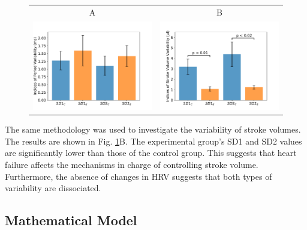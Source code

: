 \documentclass[%
preprint,
 amsmath,amssymb,
 aps,
]{revtex4-2}
\begin{document}
\begin{figure}[h!]
    \begin{tabular}{cc}
        A & B \\
        \includegraphics[width=3in]{Fig02_A.pdf} &
        \includegraphics[width=3in]{Fig02_B.pdf}
    \end{tabular}
    \caption{}
    \label{fig:fig02}
\end{figure}

The same methodology was used to investigate the variability of stroke volumes. The results are shown in Fig. \ref{fig:fig02}B. The experimental group's SD1 and SD2 values are significantly lower than those of the control group. This suggests that heart failure affects the mechanisms in charge of controlling stroke volume. Furthermore, the absence of changes in HRV suggests that both types of variability are dissociated.

\subsection{Mathematical Model}
\end{document}
